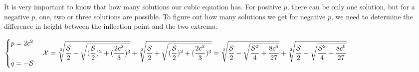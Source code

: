 \documentclass[fleqn]{article}
\begin{document}
It is very important to know that how many solutions our cubic equation has. For positive $p$, 
there can be only one solution, but for a negative $p$, one, two or three solutions are possible. 
To figure out how many solutions we get for negative $p$, we need to determine the difference in height 
between the inflection point and the two extrema.

\pagebreak

$
  \begin{cases}
    p=2c^2
    \\
    \\
    q=-\mathcal{S}
  \end{cases}
  \\
  \\
  \\
  \mathcal{X}=\sqrt[3]{\dfrac{\mathcal{S}}{2}-\sqrt{(\dfrac{\mathcal{S}}{2})^2+(\dfrac{2c^2}{3})^3}}
  +\sqrt[3]{\dfrac{\mathcal{S}}{2}+\sqrt{(\dfrac{\mathcal{S}}{2})^2+(\dfrac{2c^2}{3})^3}}
  \\
  \\
  \\
  =\sqrt[3]{\dfrac{\mathcal{S}}{2}-\sqrt{\dfrac{\mathcal{S}^2}{4}+\dfrac{8c^6}{27}}}
  +\sqrt[3]{\dfrac{\mathcal{S}}{2}+\sqrt{\dfrac{\mathcal{S}^2}{4}+\dfrac{8c^6}{27}}}
  \\
  \\
  \\
$

\pagebreak
\end{document}
